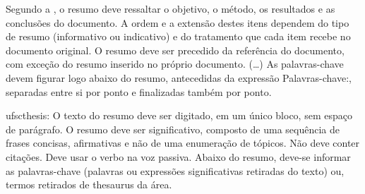 

\begin{abntcomment}

    Segundo a , o resumo deve ressaltar o
    objetivo, o método, os resultados e as conclusões do documento. A ordem e a extensão
    destes itens dependem do tipo de resumo (informativo ou indicativo) e do
    tratamento que cada item recebe no documento original. O resumo deve ser
    precedido da referência do documento, com exceção do resumo inserido no
    próprio documento. (\ldots) As palavras-chave devem figurar logo abaixo do
    resumo, antecedidas da expressão Palavras-chave:, separadas entre si por
    ponto e finalizadas também por ponto.

    ufscthesis: O texto do resumo deve ser digitado, em um único bloco, sem espaço de parágrafo. O resumo deve
    ser significativo, composto de uma sequência de frases concisas, afirmativas e não de uma
    enumeração de tópicos. Não deve conter citações. Deve usar o verbo na voz passiva. Abaixo do
    resumo, deve-se informar as palavras-chave (palavras ou expressões significativas retiradas do
    texto) ou, termos retirados de thesaurus da área. \showfont

\end{abntcomment}



